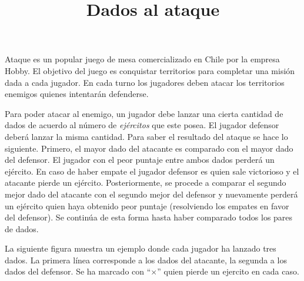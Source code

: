 \documentclass{oci}
\title{Dados al ataque}
\newcommand{\pierde}{$\times$}
\begin{document}
\begin{problemDescription}
  Ataque es un popular juego de mesa comercializado en Chile por la empresa Hobby.
  El objetivo del juego es conquistar territorios para completar una misión dada
  a cada jugador.
  En cada turno los jugadores deben atacar los territorios enemigos quienes
  intentarán defenderse.

  Para poder atacar al enemigo, un jugador debe lanzar una cierta cantidad de
  dados de acuerdo al número de \emph{ejércitos} que este posea.
  El jugador defensor deberá lanzar la misma cantidad.
  Para saber el resultado del ataque se hace lo siguiente.
  Primero, el mayor dado del atacante es comparado con el mayor dado del defensor.
  El jugador con el peor puntaje entre ambos dados perderá un ejército.
  En caso de haber empate el jugador defensor es quien sale victorioso y el
  atacante pierde un ejército.
  Posteriormente, se procede a comparar el segundo mejor dado del atacante con
  el segundo mejor del defensor y nuevamente perderá un ejército quien haya
  obtenido peor puntaje (resolviendo los empates en favor del defensor).
  Se continúa de esta forma hasta haber comparado todos los pares de dados.
  
  La siguiente figura muestra un ejemplo donde cada jugador ha lanzado tres
  dados. La primera línea corresponde a los dados del atacante, la segunda a los dados del defensor.
  Se ha marcado con ``\pierde'' quien pierde un ejercito en cada caso.
  \begin{center}
\end{center}
\end{problemDescription}
\end{document}
